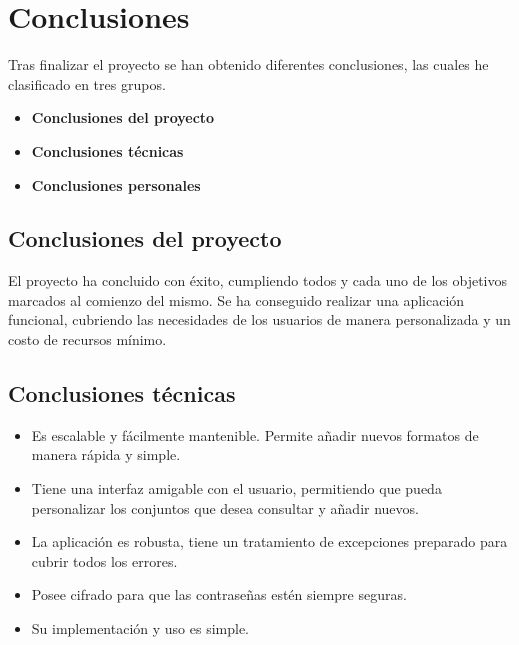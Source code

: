 \begin{comment}
Todo proyecto debe incluir las conclusiones que se derivan de su desarrollo. Éstas pueden ser de diferente índole, dependiendo de la tipología del proyecto, pero normalmente van a estar presentes un conjunto de conclusiones relacionadas con los resultados del proyecto y un conjunto de conclusiones técnicas. 
Además, resulta muy útil realizar un informe crítico indicando cómo se puede mejorar el proyecto, o cómo se puede continuar trabajando en la línea del proyecto realizado. 
\end{comment}

\section{Conclusiones}

Tras finalizar el proyecto se han obtenido diferentes conclusiones, las cuales he clasificado en tres grupos.
\begin{itemize}
    \item \textbf{Conclusiones del proyecto}
    \item \textbf{Conclusiones técnicas}
    \item \textbf{Conclusiones personales}
\end{itemize}

\subsection{Conclusiones del proyecto}
El proyecto ha concluido con éxito, cumpliendo todos y cada uno de los objetivos marcados al comienzo del mismo. Se ha conseguido realizar una aplicación funcional, cubriendo las necesidades de los usuarios de manera personalizada y un costo de recursos mínimo.

\subsection{Conclusiones técnicas}
\begin{itemize}
    \item Es escalable y fácilmente mantenible. Permite añadir nuevos formatos de manera rápida y simple.
    \item Tiene una interfaz amigable con el usuario, permitiendo que pueda personalizar los conjuntos que desea consultar y añadir nuevos. 
    \item La aplicación es robusta, tiene un tratamiento de excepciones preparado para cubrir todos los errores. 
    \item Posee cifrado para que las contraseñas estén siempre seguras.
    \item Su implementación y uso es simple.
\end{itemize}

